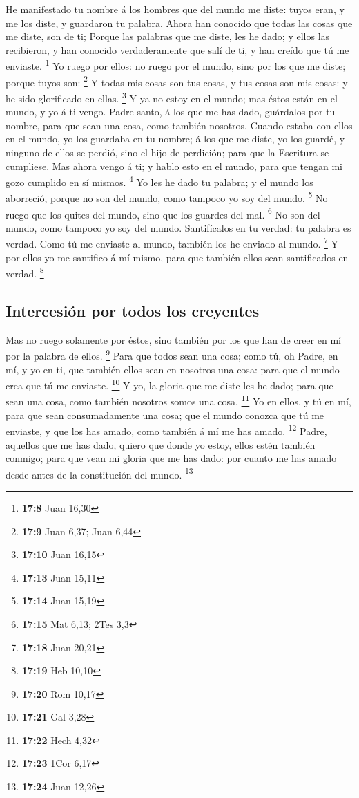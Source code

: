  He manifestado tu nombre á los hombres que del mundo me
diste: tuyos eran, y me los diste, y guardaron tu palabra. 
Ahora han conocido que todas las cosas que me diste, son de ti;
 Porque las palabras que me diste, les he dado; y ellos las
recibieron, y han conocido verdaderamente que salí de ti, y han creído
que tú me enviaste. \footnote{\textbf{17:8} Juan 16,30}  Yo
ruego por ellos: no ruego por el mundo, sino por los que me diste;
porque tuyos son: \footnote{\textbf{17:9} Juan 6,37; Juan 6,44}
 Y todas mis cosas son tus cosas, y tus cosas son mis
cosas: y he sido glorificado en ellas. \footnote{\textbf{17:10} Juan
  16,15}  Y ya no estoy en el mundo; mas éstos están en el
mundo, y yo á ti vengo. Padre santo, á los que me has dado, guárdalos
por tu nombre, para que sean una cosa, como también nosotros.
 Cuando estaba con ellos en el mundo, yo los guardaba en tu
nombre; á los que me diste, yo los guardé, y ninguno de ellos se perdió,
sino el hijo de perdición; para que la Escritura se cumpliese.
 Mas ahora vengo á ti; y hablo esto en el mundo, para que
tengan mi gozo cumplido en sí mismos. \footnote{\textbf{17:13} Juan
  15,11}  Yo les he dado tu palabra; y el mundo los
aborreció, porque no son del mundo, como tampoco yo soy del mundo.
\footnote{\textbf{17:14} Juan 15,19}  No ruego que los
quites del mundo, sino que los guardes del mal. \footnote{\textbf{17:15}
  Mat 6,13; 2Tes 3,3}  No son del mundo, como tampoco yo
soy del mundo.  Santifícalos en tu verdad: tu palabra es
verdad.  Como tú me enviaste al mundo, también los he
enviado al mundo. \footnote{\textbf{17:18} Juan 20,21}  Y
por ellos yo me santifico á mí mismo, para que también ellos sean
santificados en verdad. \footnote{\textbf{17:19} Heb 10,10}

\hypertarget{intercesiuxf3n-por-todos-los-creyentes}{%
\subsection{Intercesión por todos los
creyentes}\label{intercesiuxf3n-por-todos-los-creyentes}}

 Mas no ruego solamente por éstos, sino también por los que
han de creer en mí por la palabra de ellos. \footnote{\textbf{17:20} Rom
  10,17}  Para que todos sean una cosa; como tú, oh Padre,
en mí, y yo en ti, que también ellos sean en nosotros una cosa: para que
el mundo crea que tú me enviaste. \footnote{\textbf{17:21} Gal 3,28}
 Y yo, la gloria que me diste les he dado; para que sean
una cosa, como también nosotros somos una cosa. \footnote{\textbf{17:22}
  Hech 4,32}  Yo en ellos, y tú en mí, para que sean
consumadamente una cosa; que el mundo conozca que tú me enviaste, y que
los has amado, como también á mí me has amado. \footnote{\textbf{17:23}
  1Cor 6,17}  Padre, aquellos que me has dado, quiero que
donde yo estoy, ellos estén también conmigo; para que vean mi gloria que
me has dado: por cuanto me has amado desde antes de la constitución del
mundo. \footnote{\textbf{17:24} Juan 12,26}

